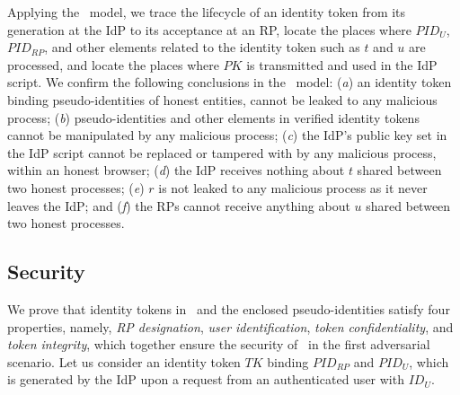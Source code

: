Applying the \dyu\ model, we trace the lifecycle of an identity token from its generation at the IdP to its acceptance at an RP, locate the places where $PID_U$, $PID_{RP}$, and other elements related to the identity token such as $t$ and $u$ are processed, and locate the places where $PK$ is transmitted and used in the IdP script.
We confirm the following conclusions in the \dyu\ model:
 (\emph{a}) an identity token binding pseudo-identities of honest entities, cannot be leaked to any malicious process;
 (\emph{b}) pseudo-identities and other elements in verified identity tokens cannot be manipulated by any malicious process;
    (\emph{c}) the IdP's public key set in the IdP script cannot be replaced or tampered with by any malicious process, within an honest browser;
 (\emph{d}) the IdP receives nothing about $t$ shared between two honest processes;
 (\emph{e}) $r$ is not leaked to any malicious process as it never leaves the IdP;
and (\emph{f}) the RPs cannot receive anything about $u$ shared between two honest processes.



\subsection{Security}
\label{analysis-security}


We prove that identity tokens in \usso\ and the enclosed pseudo-identities satisfy four properties, namely, \emph{RP designation}, \emph{user identification}, \emph{token confidentiality}, and \emph{token integrity}, which together ensure the security of \usso\ in the first adversarial scenario.
Let us consider an identity token $TK$ binding $PID_{RP}$ and $PID_U$, which is generated by the IdP upon a request from an authenticated user with $ID_U$.


